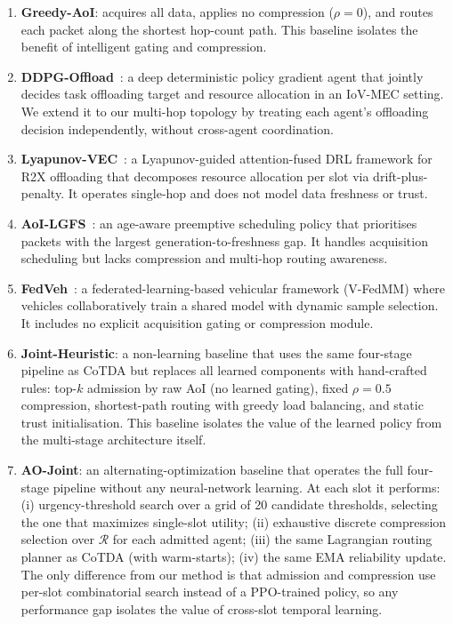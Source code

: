 \documentclass[final,3p,times,review,sort&compress]{elsarticle}
\begin{document}
\begin{enumerate}
\item \textbf{Greedy-AoI}: acquires all data, applies no compression ($\rho{=}0$), and routes each packet along the shortest hop-count path. This baseline isolates the benefit of intelligent gating and compression.
\item \textbf{DDPG-Offload}~\cite{ZHAO2023103193}: a deep deterministic policy gradient agent that jointly decides task offloading target and resource allocation in an IoV-MEC setting. We extend it to our multi-hop topology by treating each agent's offloading decision independently, without cross-agent coordination.
\item \textbf{Lyapunov-VEC}~\cite{KANG2026111852}: a Lyapunov-guided attention-fused DRL framework for R2X offloading that decomposes resource allocation per slot via drift-plus-penalty. It operates single-hop and does not model data freshness or trust.
\item \textbf{AoI-LGFS}~\cite{MOHAMMED2025111706}: an age-aware preemptive scheduling policy that prioritises packets with the largest generation-to-freshness gap. It handles acquisition scheduling but lacks compression and multi-hop routing awareness.
\item \textbf{FedVeh}~\cite{TU2026112020}: a federated-learning-based vehicular framework (V-FedMM) where vehicles collaboratively train a shared model with dynamic sample selection. It includes no explicit acquisition gating or compression module.
\item \textbf{Joint-Heuristic}: a non-learning baseline that uses the same four-stage pipeline as CoTDA but replaces all learned components with hand-crafted rules: top-$k$ admission by raw AoI (no learned gating), fixed $\rho{=}0.5$ compression, shortest-path routing with greedy load balancing, and static trust initialisation. This baseline isolates the value of the learned policy from the multi-stage architecture itself.
\item \textbf{AO-Joint}: an alternating-optimization baseline that operates the full four-stage pipeline without any neural-network learning. At each slot it performs: (i) urgency-threshold search over a grid of 20 candidate thresholds, selecting the one that maximizes single-slot utility; (ii) exhaustive discrete compression selection over $\mathcal{R}$ for each admitted agent; (iii) the same Lagrangian routing planner as CoTDA (with warm-starts); (iv) the same EMA reliability update. The only difference from our method is that admission and compression use per-slot combinatorial search instead of a PPO-trained policy, so any performance gap isolates the value of cross-slot temporal learning.

\end{enumerate}
\end{document}
